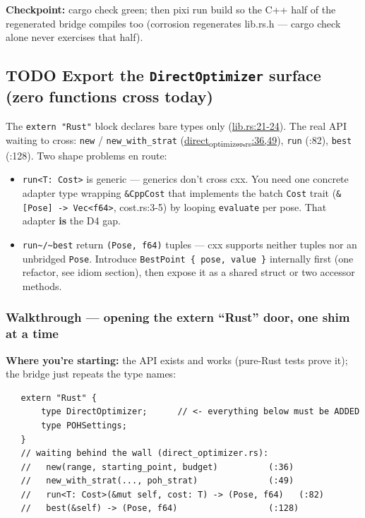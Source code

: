 \documentclass[11pt]{article}
\begin{document}
\textbf{Checkpoint:} cargo check green; then pixi run build so the C++ half of
the regenerated bridge compiles too (corrosion regenerates lib.rs.h —
cargo check alone never exercises that half).
\subsection{{\bfseries\sffamily TODO} Export the \texttt{DirectOptimizer} surface (zero functions cross today)}
\label{sec:org8d6dc14}
The \texttt{extern "Rust"} block declares bare types only (\href{rust/direct-rs/src/lib.rs}{lib.rs:21-24}). The
real API waiting to cross: \texttt{new} / \texttt{new\_with\_strat}
(\href{rust/direct-rs/src/direct\_optimizer.rs}{direct\textsubscript{optimizer.rs}:36,49}), \texttt{run}
(:82), \texttt{best} (:128). Two shape problems en route:
\begin{itemize}
\item \texttt{run<T: Cost>} is generic — generics don't cross cxx. You need one
concrete adapter type wrapping \texttt{\&CppCost} that implements the batch
\texttt{Cost} trait (\texttt{\&[Pose] -> Vec<f64>}, cost.rs:3-5) by looping
\texttt{evaluate} per pose. That adapter \textbf{is} the D4 gap.
\item \texttt{run\textasciitilde{}/\textasciitilde{}best} return \texttt{(Pose, f64)} tuples — cxx supports neither
tuples nor an unbridged \texttt{Pose}. Introduce \texttt{BestPoint \{ pose, value \}}
internally first (one refactor, see idiom section), then expose it as
a shared struct or two accessor methods.
\end{itemize}
\subsubsection{Walkthrough — opening the extern ``Rust'' door, one shim at a time}
\label{sec:orgefdd9a5}

\textbf{Where you're starting:} the API exists and works (pure-Rust tests prove
it); the bridge just repeats the type names:

\begin{verbatim}
   extern "Rust" {
       type DirectOptimizer;      // <- everything below must be ADDED
       type POHSettings;
   }
   // waiting behind the wall (direct_optimizer.rs):
   //   new(range, starting_point, budget)          (:36)
   //   new_with_strat(..., poh_strat)              (:49)
   //   run<T: Cost>(&mut self, cost: T) -> (Pose, f64)   (:82)
   //   best(&self) -> (Pose, f64)                  (:128)
\end{verbatim}
\end{document}
